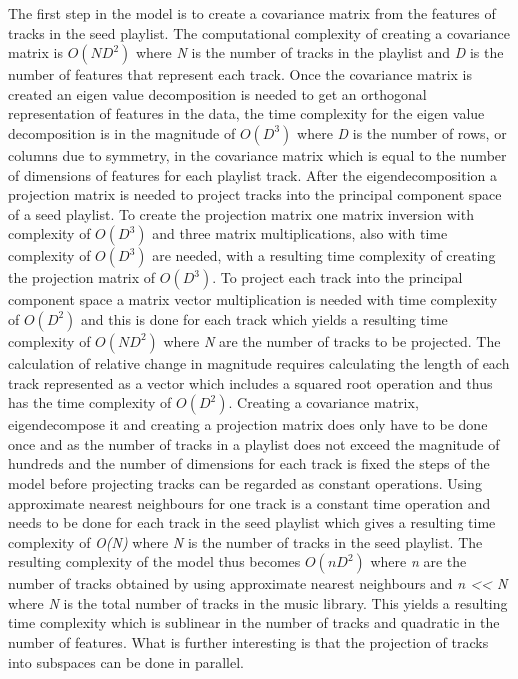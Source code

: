 \documentclass[a4paper,11pt]{kth-mag}
\begin{document}
The first step in the model is to create a covariance matrix from the features of tracks in the seed playlist. The computational complexity of creating a covariance matrix is $O(ND^2)$ where \textit{N} is the number of tracks in the playlist and \textit{D} is the number of features that represent each track\cite{kwatra2010fast}. Once the covariance matrix is created an eigen value decomposition is needed to get an orthogonal representation of features in the data, the time complexity for the eigen value decomposition is in the magnitude of $O(D^3)$ where \textit{D} is the number of rows, or columns due to symmetry, in the covariance matrix which is equal to the number of dimensions of features for each playlist track\cite{pan1999complexity}. After the eigendecomposition a projection matrix is needed to project tracks into the principal component space of a seed playlist. To create the projection matrix one matrix inversion with complexity of $O(D^3)$ and three matrix multiplications, also with time complexity of $O(D^3)$ are needed, with a resulting time complexity of creating the projection matrix of $O(D^3)$. To project each track into the principal component space a matrix vector multiplication is needed with time complexity of $O(D^2)$ and this is done for each track which yields a resulting time complexity of $O(ND^2)$ where \textit{N} are the number of tracks to be projected. The calculation of relative change in magnitude requires calculating the length of each track represented as a vector which includes a squared root operation and thus has the time complexity of $O(D^2)$. Creating a covariance matrix, eigendecompose it and creating a projection matrix does only have to be done once and as the number of tracks in a playlist does not exceed the magnitude of hundreds and the number of dimensions for each track is fixed the steps of the model before projecting tracks can be regarded as constant operations. Using approximate nearest neighbours for one track is a constant time operation and needs to be done for each track in the seed playlist which gives a resulting time complexity of \textit{O(N)} where \textit{N} is the number of tracks in the seed playlist. The resulting complexity of the model thus becomes $O(nD^2)$ where \textit{n} are the number of tracks obtained by using approximate nearest neighbours and \textit{n << N} where \textit{N} is the total number of tracks in the music library. This yields a resulting time complexity which is sublinear in the number of tracks and quadratic in the number of features. What is further interesting is that the projection of tracks into subspaces can be done in parallel.
\end{document}
